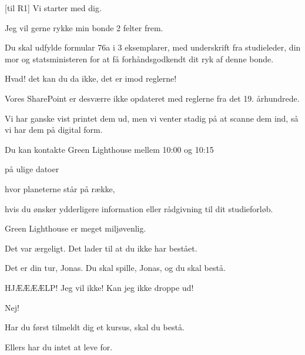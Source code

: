 \documentclass[a4paper,11pt]{article}
\begin{document}
\begin{sketch}


[til R1] Vi starter med dig.

 Jeg vil gerne rykke min bonde 2 felter frem.


 Du skal udfylde formular 76a i 3 eksemplarer, med underskrift fra
studieleder, din mor og statsministeren for at få forhåndsgodkendt dit ryk af
denne bonde.


 Hvad! det kan du da ikke, det er imod reglerne!

 Vores SharePoint er desværre ikke opdateret med reglerne fra det 19. århundrede.  

 Vi har ganske vist printet dem ud, men vi venter stadig på at scanne dem ind, så vi har dem på digital form. 

 Du kan kontakte Green Lighthouse mellem 10:00 og 10:15 

 på ulige datoer 

 hvor planeterne står på række, 

 hvis du ønsker ydderligere information eller rådgivning til dit studieforløb. 

 Green Lighthouse er meget miljøvenlig.


 Det var ærgeligt.  Det lader til at du ikke har bestået.




 Det er din tur, Jonas.  Du skal spille, Jonas, og du skal bestå.

 HJÆÆÆÆLP!  Jeg vil ikke! Kan jeg ikke droppe ud!

 Nej!  

 Har du først tilmeldt dig et kursus, skal du bestå.

 Ellers har du intet at leve for. 


\end{sketch}
\end{document}
